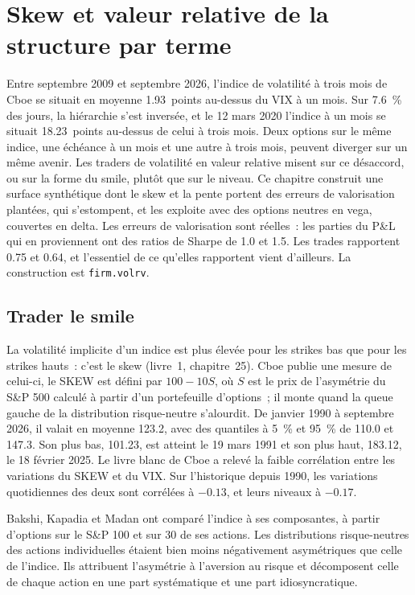 \chapter{Skew et valeur relative de la structure par terme}\label{ch:s2:skew-and-term-structure-relative-value}

Entre septembre 2009 et septembre 2026, l'indice de volatilité à trois mois de Cboe se situait en moyenne 1.93~points au-dessus du VIX à un mois. Sur 7.6~\% des jours, la
hiérarchie s'est inversée, et le 12 mars 2020 l'indice à un mois se situait 18.23~points au-dessus de celui à trois mois. Deux options sur le même indice, une échéance à un mois
et une autre à trois mois, peuvent diverger sur un même avenir. Les traders de volatilité en valeur relative misent sur ce désaccord, ou sur la forme du smile,
plutôt que sur le niveau. Ce chapitre construit une surface synthétique dont le skew et la pente portent des erreurs de valorisation plantées, qui s'estompent, et les exploite avec
des options neutres en vega, couvertes en delta. Les erreurs de valorisation sont réelles~: les parties du P\&L qui en proviennent ont des ratios de Sharpe de 1.0 et 1.5. Les trades
rapportent 0.75 et 0.64, et l'essentiel de ce qu'elles rapportent vient d'ailleurs. La construction est \texttt{firm.volrv}.

\section{Trader le smile}

La volatilité implicite d'un indice est plus élevée pour les strikes bas que pour les strikes hauts~: c'est le skew (livre~1, chapitre~25). Cboe publie une mesure de celui-ci, le SKEW
est défini par $100 - 10S$, où $S$ est le prix de l'asymétrie du S\&P 500 calculé à partir d'un portefeuille d'options~; il monte quand la
queue gauche de la distribution risque-neutre s'alourdit. De janvier 1990 à septembre 2026, il valait en moyenne 123.2, avec des quantiles à 5~\% et 95~\% de 110.0 et 147.3.
Son plus bas, 101.23, est atteint le 19 mars 1991 et son plus haut, 183.12, le 18 février 2025. Le livre blanc de Cboe a relevé la faible corrélation entre les variations du SKEW et du VIX. Sur l'historique depuis
1990, les variations quotidiennes des deux sont corrélées à $-0.13$, et leurs niveaux à $-0.17$.

Bakshi, Kapadia et Madan ont comparé l'indice à ses composantes, à partir d'options sur le S\&P 100 et sur 30 de ses actions. Les distributions risque-neutres
des actions individuelles étaient bien moins négativement asymétriques que celle de l'indice. Ils attribuent l'asymétrie à l'aversion au risque et décomposent celle de chaque action en une part systématique
et une part idiosyncratique.

